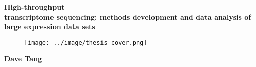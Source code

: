 \documentclass[10pt,a4paper]{article}
\begin{document}

\vspace{3cm}

\centering
\Huge\textbf{High-throughput \\ transcriptome sequencing: methods development and data analysis of large expression data sets}

\vspace{2.0cm}

\begin{figure}[!ht]
   \centering
   \hspace*{-3.1cm}
   \texttt{[image: ../image/thesis\_cover.png]}
\end{figure}

\vfill

\begin{center}
\large\textbf{Dave Tang}
\end{center}
\end{document}
